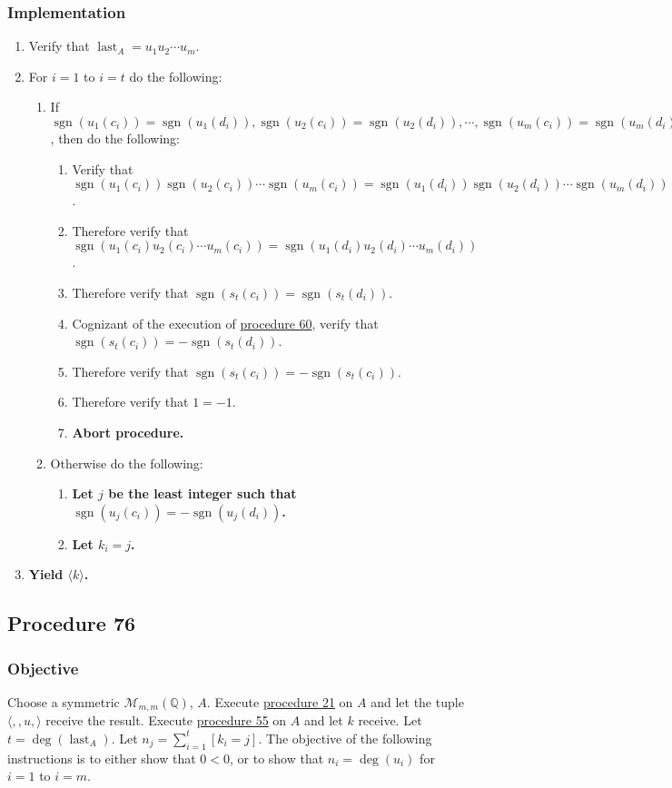 \documentclass[twocolumn]{article}
\DeclareMathOperator{\sgn}{sgn}
\DeclareMathOperator{\last}{last}
\begin{document}
			\subsubsection{Implementation}
				\begin{enumerate}
					\item Verify that $\last_A=u_1u_2\cdots u_m$.
					\item For $i=1$ to $i=t$ do the following:
					\begin{enumerate}
						\item If $\sgn(u_1(c_i))=\sgn(u_1(d_i)), \sgn(u_2(c_i))=\sgn(u_2(d_i)), \cdots, \sgn(u_m(c_i))=\sgn(u_m(d_i))$, then do the following:
						\begin{enumerate}
							\item Verify that $\sgn(u_1(c_i))\sgn(u_2(c_i))\cdots\sgn(u_m(c_i))=\sgn(u_1(d_i))\sgn(u_2(d_i))\cdots\sgn(u_m(d_i))$.
							\item Therefore verify that $\sgn(u_1(c_i)u_2(c_i)\cdots u_m(c_i))=\sgn(u_1(d_i)u_2(d_i)\cdots u_m(d_i))$.
							\item Therefore verify that $\sgn(s_t(c_i))=\sgn(s_t(d_i))$.
							\item Cognizant of the execution of \hyperref[sec:procedure 60]{procedure 60}, verify that $\sgn(s_t(c_i))=-\sgn(s_t(d_i))$.
							\item Therefore verify that $\sgn(s_t(c_i))=-\sgn(s_t(c_i))$.
							\item Therefore verify that $1=-1$.
							\item \textbf{Abort procedure.}
						\end{enumerate}
						\item Otherwise do the following:
						\begin{enumerate}
							\item \textbf{Let $j$ be the least integer such that $\sgn(u_j(c_i))=-\sgn(u_j(d_i))$.}
							\item \textbf{Let $k_i=j$.}
						\end{enumerate}
					\end{enumerate}
					\item \textbf{Yield $\langle k\rangle$.}
				\end{enumerate}
		\subsection{Procedure 76}\label{sec:procedure 76}
			\subsubsection{Objective}
				Choose a symmetric $\mathcal{M}_{m,m}(\mathbb{Q})$, $A$. Execute \hyperref[sec:procedure 21]{procedure 21} on $A$ and let the tuple $\langle,,u,\rangle$ receive the result. Execute \hyperref[sec:procedure 55]{procedure 55} on $A$ and let $k$ receive. Let $t=\deg(\last_A)$. Let $n_j=\sum_{i=1}^t [k_i=j]$. The objective of the following instructions is to either show that $0<0$, or to show that $n_i=\deg(u_i)$ for $i=1$ to $i=m$.
\end{document}
